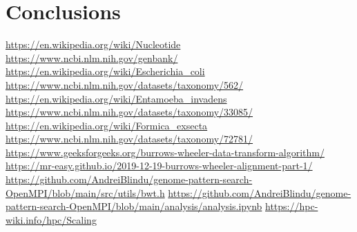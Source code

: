\documentclass[final,5p,times,twocolumn,authoryear]{elsarticle}
\begin{document}
\section{Conclusions}

\begin{thebibliography}{9}
 \url{https://en.wikipedia.org/wiki/Nucleotide}
 \url{https://www.ncbi.nlm.nih.gov/genbank/}
 \url{https://en.wikipedia.org/wiki/Escherichia_coli}
 \url{https://www.ncbi.nlm.nih.gov/datasets/taxonomy/562/}
 \url{https://en.wikipedia.org/wiki/Entamoeba_invadens}
 \url{https://www.ncbi.nlm.nih.gov/datasets/taxonomy/33085/}
 \url{https://en.wikipedia.org/wiki/Formica_exsecta}
 \url{https://www.ncbi.nlm.nih.gov/datasets/taxonomy/72781/}
\url{https://www.geeksforgeeks.org/burrows-wheeler-data-transform-algorithm/}
\url{https://mr-easy.github.io/2019-12-19-burrows-wheeler-alignment-part-1/}
\url{https://github.com/AndreiBlindu/genome-pattern-search-OpenMPI/blob/main/src/utils/bwt.h}
\url{https://github.com/AndreiBlindu/genome-pattern-search-OpenMPI/blob/main/analysis/analysis.ipynb}
\url{https://hpc-wiki.info/hpc/Scaling}
\end{thebibliography}
\end{document}
